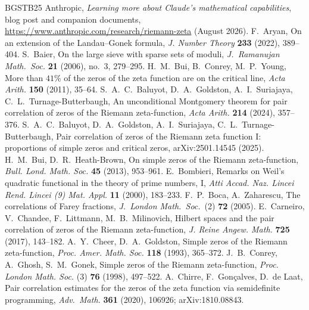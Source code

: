 \documentclass[11pt]{amsart}
\theoremstyle{definition}
\theoremstyle{remark}
\numberwithin{equation}{section}
\begin{document}
\begin{thebibliography}{BGSTB25}
 Anthropic, \emph{Learning more about Claude's mathematical capabilities}, blog post and companion documents, \url{https://www.anthropic.com/research/riemann-zeta} (August 2026).
 F.~Aryan, On an extension of the Landau--Gonek formula, \emph{J. Number Theory} \textbf{233} (2022), 389--404.
 S.~Baier, On the large sieve with sparse sets of moduli, \emph{J.\ Ramanujan Math.\ Soc.} \textbf{21} (2006), no.~3, 279--295.
 H.~M.~Bui, B.~Conrey, M.~P.~Young, More than $41\%$ of the zeros of the zeta function are on the critical line, \emph{Acta Arith.} \textbf{150} (2011), 35--64.
 S.~A.~C.~Baluyot, D.~A.~Goldston, A.~I.~Suriajaya, C.~L.~Turnage-Butterbaugh, An unconditional Montgomery theorem for pair correlation of zeros of the Riemann zeta-function, \emph{Acta Arith.} \textbf{214} (2024), 357--376.
 S.~A.~C.~Baluyot, D.~A.~Goldston, A.~I.~Suriajaya, C.~L.~Turnage-Butterbaugh, Pair correlation of zeros of the Riemann zeta function I: proportions of simple zeros and critical zeros, arXiv:2501.14545 (2025).
 H.~M.~Bui, D.~R.~Heath-Brown, On simple zeros of the Riemann zeta-function, \emph{Bull. Lond. Math. Soc.} \textbf{45} (2013), 953--961.
 E.~Bombieri, Remarks on Weil's quadratic functional in the theory of prime numbers, I, \emph{Atti Accad. Naz. Lincei Rend. Lincei (9) Mat. Appl.} \textbf{11} (2000), 183--233.
 F.~P.~Boca, A.~Zaharescu, The correlations of Farey fractions, \emph{J.\ London Math.\ Soc.}~(2) \textbf{72} (2005). %
 E.~Carneiro, V.~Chandee, F.~Littmann, M.~B.~Milinovich, Hilbert spaces and the pair correlation of zeros of the Riemann zeta-function, \emph{J. Reine Angew. Math.} \textbf{725} (2017), 143--182.
 A.~Y.~Cheer, D.~A.~Goldston, Simple zeros of the Riemann zeta-function, \emph{Proc. Amer. Math. Soc.} \textbf{118} (1993), 365--372.
 J.~B.~Conrey, A.~Ghosh, S.~M.~Gonek, Simple zeros of the Riemann zeta-function, \emph{Proc. London Math. Soc.} (3) \textbf{76} (1998), 497--522.
 A.~Chirre, F.~Gon\c{c}alves, D.~de Laat, Pair correlation estimates for the zeros of the zeta function via semidefinite programming, \emph{Adv.\ Math.} \textbf{361} (2020), 106926; arXiv:1810.08843.

\end{thebibliography}
\end{document}
